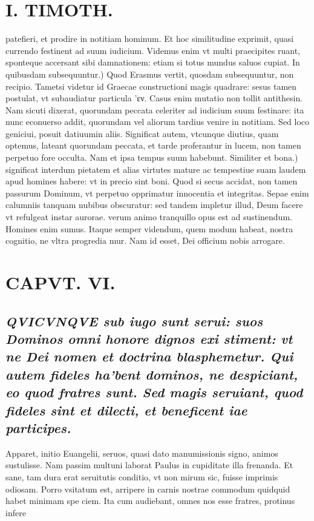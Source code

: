 \documentclass{article}
\begin{document}
\begin{pages}
\section*{I. TIMOTH. }
\marginpar{[ p.72 ]}\pstart patefieri, et prodire in notitiam hominum. Et hoc similitudine exprimit, quasi currendo festinent ad suum iudicium. Videmus enim vt multi praecipites ruant, sponteque accersant sibi damnationem: etiam si totus mundus saluos cupiat.  \pend\pstart In quibusdam subsequuntur.) Quod Erasmus vertit, quosdam subsequuntur, non recipio. Tametsi videtur id Graecae constructioni magis quadrare: sesus tamen postulat, vt subaudiatur particula ’εν. Casus enim mutatio non tollit antithesin. Nam sicuti dixerat, quorundam peccata celeriter ad iudicium suum festinare: ita nunc econuerso addit, quorundam vel aliorum tardius venire in notitiam. Sed loco geniciui, posuit datiuumin aliis. Significat autem, vtcunque diutius, quam optemus, lateant quorundam peccata, et tarde proferantur in lucem, non tamen perpetuo fore occulta. Nam et ipsa tempus suum habebunt.  \pend\pstart Similiter et bona.) significat interdum pietatem et alias virtutes mature ac tempestiue suam laudem apud homines habere: vt in precio sint boni. Quod si secus accidat, non tamen passurum Dominum, vt perpetuo opprimatur innocentia et integritas. Sepae enim calumniis tanquam nubibus obscuratur: sed tandem impletur illud, Deum facere vt refulgeat instar aurorae. verum animo tranquillo opus est ad sustinendum. Homines enim sumus. Itaque semper videndum, quem modum habeat, nostra cognitio, ne vltra progredia mur. Nam id esset, Dei officium nobis arrogare.  \pend
\endnumbering\beginnumbering\section{CAPVT. VI.}
{}
\subsection*{\textit{\huge\textbf{Q}\normalsize VICVNQVE sub iugo sunt serui: suos Dominos omni honore dignos exi stiment: vt ne Dei nomen et doctrina blasphemetur. Qui autem fideles ha'bent dominos, ne despiciant, eo quod fratres sunt. Sed magis seruiant, quod fideles sint et dilecti, et beneficent iae participes. }}\pstart Apparet, initio Euangelii, seruos, quasi dato manumissionis signo, animos sustulisse. Nam passim multuni laborat Paulus in cupiditate illa frenanda. Et sane, tam dura erat seruitutis conditio, vt non mirum sic, fuisse imprimis odiosam. Porro vsitatum est, arripere in carnis nostrae commodum quidquid habet minimam spe ciem. Ita cum audiebant, omnes nos esse fratres, protinus infere\pend

\end{pages}
\end{document}
